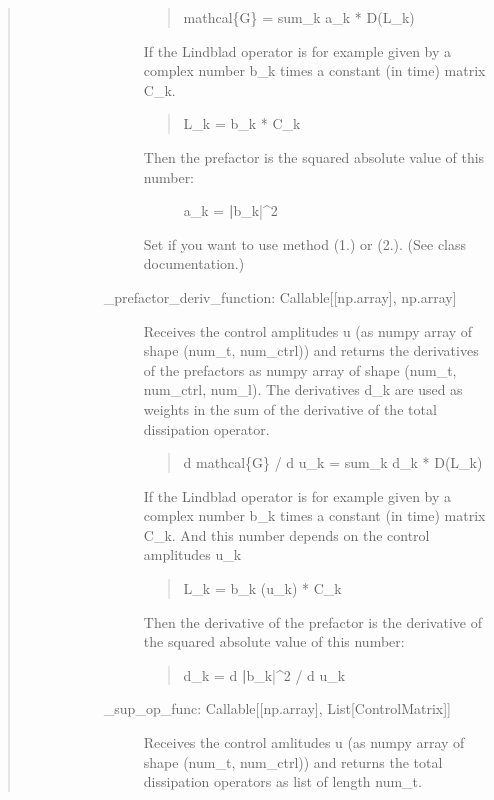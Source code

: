 \documentclass[letterpaper,10pt,english]{sphinxmanual}
\begin{document}
\begin{fulllineitems}
\begin{quote}
\begin{description}
\begin{description}
\begin{description}
\begin{quote}
mathcal\{G\} = sum\_k a\_k * D(L\_k)
\end{quote}

If the Lindblad operator is for example given by a complex number b\_k
times a constant (in time) matrix C\_k.
\begin{quote}

L\_k = b\_k * C\_k
\end{quote}
\begin{description}
\item[{Then the prefactor is the squared absolute value of this number:}] \leavevmode
a\_k = {\color{red}\bfseries{}|}b\_k|\textasciicircum{}2

\end{description}

Set if you want to use method (1.) or (2.). (See class documentation.)

\item[{\_prefactor\_deriv\_function: Callable{[}{[}np.array{]}, np.array{]}}] \leavevmode
Receives the control amplitudes u (as numpy array of shape
(num\_t, num\_ctrl)) and returns the derivatives of the
prefactors as numpy array of shape (num\_t, num\_ctrl, num\_l). The
derivatives d\_k are used as weights in the sum of the derivative of the
total dissipation operator.
\begin{quote}

d mathcal\{G\} / d u\_k = sum\_k d\_k * D(L\_k)
\end{quote}

If the Lindblad operator is for example given by a complex number b\_k
times a constant (in time) matrix C\_k. And this number depends on the
control amplitudes u\_k
\begin{quote}

L\_k = b\_k (u\_k) * C\_k
\end{quote}

Then the derivative of the prefactor is the derivative of the squared
absolute value of this number:
\begin{quote}

d\_k = d {\color{red}\bfseries{}|}b\_k|\textasciicircum{}2 / d u\_k
\end{quote}

\item[{\_sup\_op\_func: Callable{[}{[}np.array{]}, List{[}ControlMatrix{]}{]}}] \leavevmode
Receives the control amlitudes u (as numpy array of shape
(num\_t, num\_ctrl)) and returns the total dissipation
operators as list of length num\_t.


\end{description}
\end{description}
\end{description}
\end{quote}
\end{fulllineitems}
\end{document}
